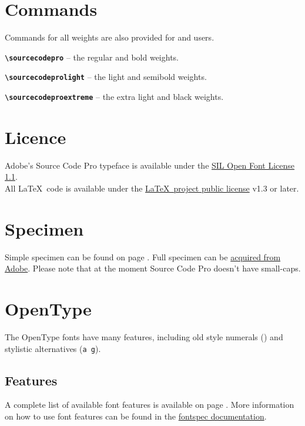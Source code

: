 \documentclass[10pt,a4paper,english]{article}
\begin{document}
\begin{multicols}{2}
\section{Commands}
Commands for all weights are also provided for  and  users.
\begin{itemize*}
	\item \texttt{\bfseries \textbackslash sourcecodepro}
		-- the regular and bold weights.
	\item \texttt{\bfseries \textbackslash sourcecodeprolight}
		-- the light and semibold weights.
	\item \texttt{\bfseries \textbackslash sourcecodeproextreme}
		-- the extra light and black weights.
\end{itemize*}

\section{Licence}
Adobe's Source Code Pro typeface is available under the \href{http://scripts.sil.org/OFL}{SIL Open Font License 1.1}.\\
All \LaTeX\ code is available under the \href{http://www.latex-project.org/lppl/}{\LaTeX\ project public license} v1.3 or later.

\section{Specimen}
Simple specimen can be found on page \pageref{sec:specimen}. Full specimen can be \href{http://adobe-fonts.github.io/source-code-pro/}{acquired from Adobe}. Please note that at the moment Source Code Pro doesn’t have small-caps.

\section{OpenType}
The OpenType fonts have many features, including old style numerals (\texttt{})
and stylistic alternatives (\texttt{{a g}}).

\subsection{Features}
A complete list of available font features is available on page \pageref{sec:otfinfo}. More information on how to use font features can be found in the \href{http://mirror.ctan.org/macros/latex/contrib/fontspec/fontspec.pdf}{fontspec documentation}.


\end{multicols}
\end{document}
